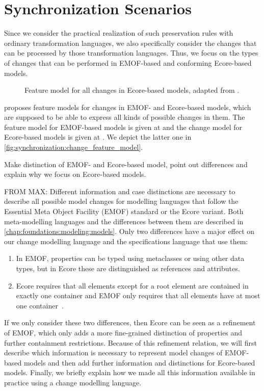 \section{Synchronization Scenarios}

Since we consider the practical realization of such preservation rules with ordinary transformation languages, we also specifically consider the changes that can be processed by those transformation languages.
Thus, we focus on the types of changes that can be performed in EMOF-based and conforming Ecore-based models.

\begin{figure}
    \centering
    \resizebox{\textwidth}{!}{}
    \caption{Feature model for all changes in Ecore-based models, adapted from \cite[Fig. 5.3]{kramer2017a}.}
    \label{fig:synchronization:change_feature_model}
\end{figure}

\textcite{kramer2017a} proposes feature models for changes in EMOF- and Ecore-based models, which are supposed to be able to express all kinds of possible changes in them.
The feature model for EMOF-based models is given at \cite[Fig. 5.2]{kramer2017a} and the change model for Ecore-based models is given at \cite[Fig. 5.3]{kramer2017a}.
We depict the latter one in \autoref{fig:synchronization:change_feature_model}.

Make distinction of EMOF- and Ecore-based model, point out differences and explain why we focus on Ecore-based models.

FROM MAX:
Different information and case distinctions are necessary to describe all possible model changes for modelling languages that follow the Essential Meta Object Facility (EMOF) standard or the Ecore variant. 
Both meta-modelling languages and the differences between them are described in \autoref{chap:foundations:modeling:models}.
Only two differences have a major effect on our change modelling language and the specifications language that use them:
\begin{enumerate}%
\item In EMOF, properties can be typed using metaclasses or using other data types, but in Ecore these are distinguished as references and attributes.
\item Ecore requires that all elements except for a root element are contained in exactly one container and EMOF only requires that all elements have at most one container~\cite[pp.\ 31-32]{mof}.
\end{enumerate}
If we only consider these two differences, then Ecore can be seen as a refinement of EMOF, which only adds a more fine-grained distinction of properties and further containment restrictions.
Because of this refinement relation, we will first describe which information is necessary to represent model changes of EMOF-based models and then add further information and distinctions for Ecore-based models.
Finally, we briefly explain how we made all this information available in practice using a change modelling language.

